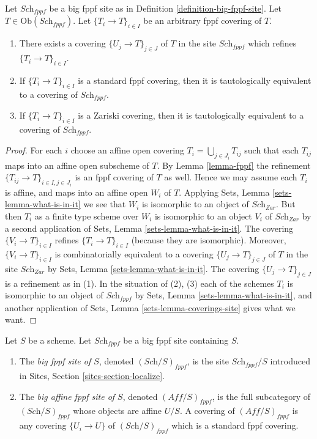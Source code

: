 \begin{lemma}
\label{lemma-fppf-induced}
Let $\textit{Sch}_{fppf}$ be a big fppf site as in
Definition \ref{definition-big-fppf-site}.
Let $T \in \text{Ob}(\textit{Sch}_{fppf})$.
Let $\{T_i \to T\}_{i \in I}$ be an arbitrary fppf covering of $T$.
\begin{enumerate}
\item There exists a covering $\{U_j \to T\}_{j \in J}$ of $T$ in the site
$\textit{Sch}_{fppf}$ which refines $\{T_i \to T\}_{i \in I}$.
\item If $\{T_i \to T\}_{i \in I}$ is a standard fppf covering, then
it is tautologically equivalent to a covering of $\textit{Sch}_{fppf}$.
\item If $\{T_i \to T\}_{i \in I}$ is a Zariski covering, then
it is tautologically equivalent to a covering of $\textit{Sch}_{fppf}$.
\end{enumerate}
\end{lemma}

\begin{proof}
For each $i$ choose an affine open covering $T_i = \bigcup_{j \in J_i} T_{ij}$
such that each $T_{ij}$ maps into an affine open subscheme of $T$. By
Lemma \ref{lemma-fppf}
the refinement $\{T_{ij} \to T\}_{i \in I, j \in J_i}$ is an fppf covering
of $T$ as well. Hence we may assume each $T_i$ is affine, and maps into
an affine open $W_i$ of $T$. Applying
Sets, Lemma \ref{sets-lemma-what-is-in-it}
we see that $W_i$ is isomorphic to an object of $\textit{Sch}_{Zar}$.
But then $T_i$ as a finite type scheme over $W_i$
is isomorphic to an object $V_i$ of $\textit{Sch}_{Zar}$ by a second
application of
Sets, Lemma \ref{sets-lemma-what-is-in-it}.
The covering $\{V_i \to T\}_{i \in I}$ refines $\{T_i \to T\}_{i \in I}$
(because they are isomorphic).
Moreover, $\{V_i \to T\}_{i \in I}$ is combinatorially equivalent to a
covering $\{U_j \to T\}_{j \in J}$ of $T$ in the site
$\textit{Sch}_{Zar}$ by
Sets, Lemma \ref{sets-lemma-what-is-in-it}.
The covering $\{U_j \to T\}_{j \in J}$ is a refinement as in (1).
In the situation of (2), (3) each of the
schemes $T_i$ is isomorphic to an object of $\textit{Sch}_{fppf}$ by
Sets, Lemma \ref{sets-lemma-what-is-in-it},
and another application of
Sets, Lemma \ref{sets-lemma-coverings-site}
gives what we want.
\end{proof}

\begin{definition}
\label{definition-big-small-fppf}
Let $S$ be a scheme. Let $\textit{Sch}_{fppf}$ be a big fppf
site containing $S$.
\begin{enumerate}
\item The {\it big fppf site of $S$}, denoted
$(\textit{Sch}/S)_{fppf}$, is the site $\textit{Sch}_{fppf}/S$
introduced in Sites, Section \ref{sites-section-localize}.
\item The {\it big affine fppf site of $S$}, denoted
$(\textit{Aff}/S)_{fppf}$, is the full subcategory of
$(\textit{Sch}/S)_{fppf}$ whose objects are affine $U/S$.
A covering of $(\textit{Aff}/S)_{fppf}$ is any covering
$\{U_i \to U\}$ of $(\textit{Sch}/S)_{fppf}$ which is a
standard fppf covering.
\end{enumerate}
\end{definition}

